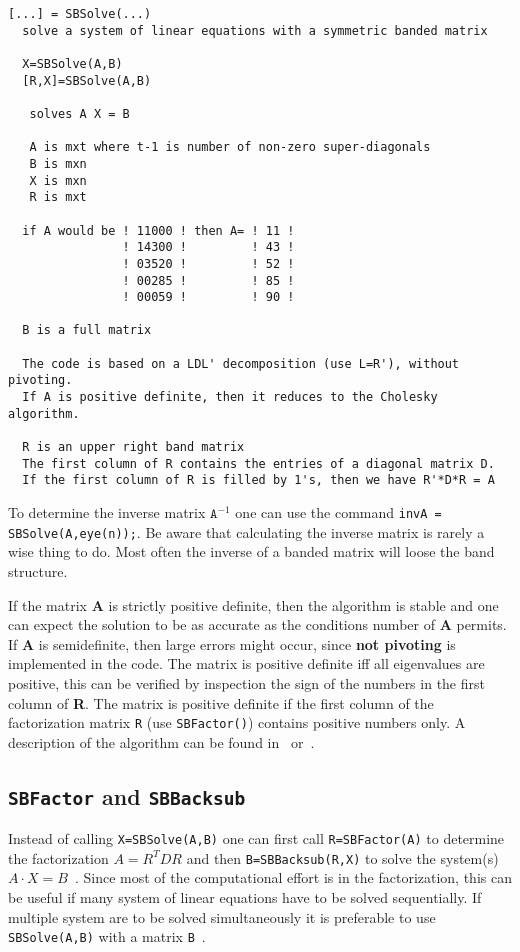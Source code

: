 \documentclass[11pt]{article}
\newcommand{\ID}[1]{\index{#1}}
\begin{document}
\begin{verbatim}
[...] = SBSolve(...)
  solve a system of linear equations with a symmetric banded matrix

  X=SBSolve(A,B)
  [R,X]=SBSolve(A,B)

   solves A X = B

   A is mxt where t-1 is number of non-zero super-diagonals
   B is mxn
   X is mxn
   R is mxt

  if A would be ! 11000 ! then A= ! 11 ! 
                ! 14300 !         ! 43 ! 
                ! 03520 !         ! 52 ! 
                ! 00285 !         ! 85 ! 
                ! 00059 !         ! 90 ! 

  B is a full matrix

  The code is based on a LDL' decomposition (use L=R'), without pivoting.
  If A is positive definite, then it reduces to the Cholesky algorithm.

  R is an upper right band matrix
  The first column of R contains the entries of a diagonal matrix D. 
  If the first column of R is filled by 1's, then we have R'*D*R = A
\end{verbatim}

To determine the \ID{matrix, inverse}inverse matrix $\mathtt{A}^{-1}$ one can
use the command \texttt{invA = SBSolve(A,eye(n));}.  Be aware that calculating
the inverse matrix is rarely a wise thing to do. Most often the inverse of a
banded matrix will loose the band structure.

If the matrix \textbf{A} is strictly positive definite, then the algorithm is
stable and one can expect the solution to be as accurate as the conditions
number of \textbf{A} permits. If \textbf{A} is semidefinite, then large errors
might occur, since \textbf{not pivoting} is implemented in the code. The
matrix is positive definite iff all eigenvalues are positive, this can be
verified by inspection the sign of the numbers in the first column of
\textbf{R}.  The matrix is positive definite if the first column of the
factorization matrix \texttt{R} (use \texttt{SBFactor()}) contains positive
numbers only. A description of the algorithm can be found
in~\cite{GoluVanLoan96} or~\cite{VarFem}.

\subsection{\texttt{SBFactor} and \texttt{SBBacksub}}
\ID{SBFactor}\ID{SBBacksub}
Instead of calling \texttt{X=SBSolve(A,B)} one can first call
\texttt{R=SBFactor(A)} to determine the factorization $A=R^TDR$ and
then \texttt{B=SBBacksub(R,X)} to solve the system(s) $A\cdot X=B$~.
Since most of the computational effort is in the factorization, this can be
useful if many system of linear equations have to be solved sequentially.
If multiple system are to be solved simultaneously it is preferable to use
\texttt{SBSolve(A,B)} with a matrix \texttt{B}~.
\end{document}
